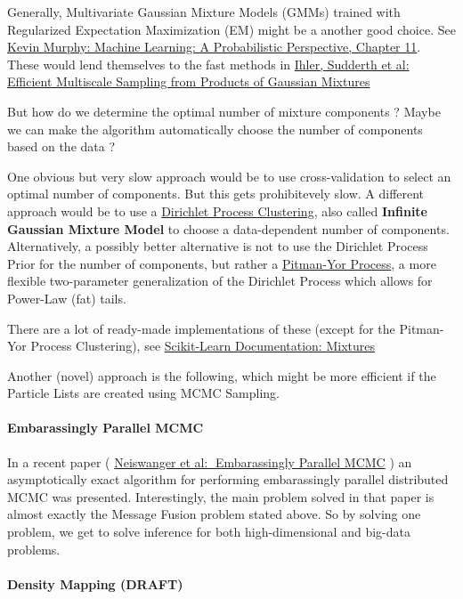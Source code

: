 \documentclass[letterpaper,10pt,english]{/home/londenberg/python-env/clean/lib/python2.7/site-packages/sphinx/texinputs/sphinxhowto}
\begin{document}
Generally, Multivariate Gaussian Mixture Models (GMMs) trained with
Regularized Expectation Maximization (EM) might be a another good
choice. See \href{http://www.cs.ubc.ca/~murphyk/MLbook/}{Kevin Murphy:
Machine Learning: A Probabilistic Perspective, Chapter 11}. These would
lend themselves to the fast methods in
\href{http://ssg.mit.edu/nbp/papers/nips03.pdf}{Ihler, Sudderth et al:
Efficient Multiscale Sampling from Products of Gaussian Mixtures}

But how do we determine the optimal number of mixture components ? Maybe
we can make the algorithm automatically choose the number of components
based on the data ?

One obvious but very slow approach would be to use cross-validation to
select an optimal number of components. But this gets prohibitevely
slow. A different approach would be to use a
\href{http://www.gatsby.ucl.ac.uk/~edward/pub/inf.mix.nips.99.pdf}{Dirichlet
Process Clustering}, also called \textbf{Infinite Gaussian Mixture
Model} to choose a data-dependent number of components. Alternatively, a
possibly better alternative is not to use the Dirichlet Process Prior
for the number of components, but rather a
\href{http://en.wikipedia.org/wiki/Pitman\%E2\%80\%93Yor\_process}{Pitman-Yor
Process}, a more flexible two-parameter generalization of the Dirichlet
Process which allows for Power-Law (fat) tails.

There are a lot of ready-made implementations of these (except for the
Pitman-Yor Process Clustering), see
\href{http://scikit-learn.org/stable/modules/mixture.html}{Scikit-Learn
Documentation: Mixtures}

Another (novel) approach is the following, which might be more efficient
if the Particle Lists are created using MCMC Sampling.\paragraph{Embarassingly Parallel MCMC}

In a recent paper (
\href{http://arxiv.org/pdf/1311.4780v1.pdf}{Neiswanger et al:
Embarassingly Parallel MCMC} ) an asymptotically exact algorithm for
performing embarassingly parallel distributed MCMC was presented.
Interestingly, the main problem solved in that paper is almost exactly
the Message Fusion problem stated above. So by solving one problem, we
get to solve inference for both high-dimensional and big-data problems.\paragraph{Density Mapping (DRAFT)}
\end{document}
